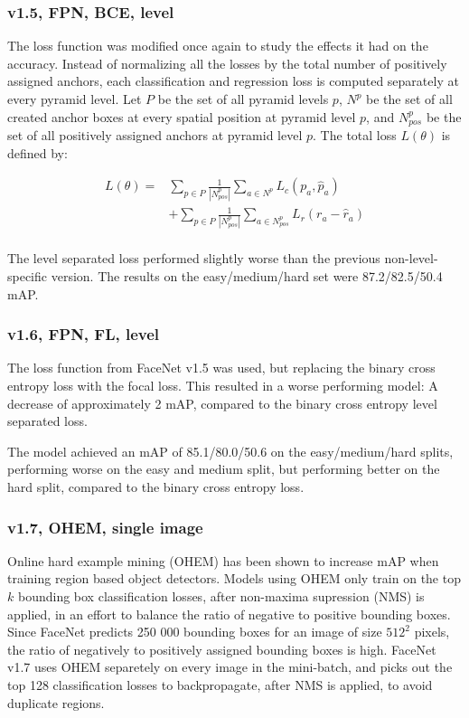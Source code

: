 \documentclass[a4paper, twoside]{article}
\begin{document}
\subsubsection{v1.5, FPN, BCE, level}
The loss function was modified once again to study the effects it had on the accuracy. Instead of normalizing all the losses by the total number of positively assigned anchors, each classification and regression loss is computed separately at every pyramid level. Let $P$ be the set of all pyramid levels $p$, $N^p$ be the set of all created anchor boxes at every spatial position at pyramid level $p$, and $N^p_{pos}$ be the set of all positively assigned anchors at pyramid level $p$. The total loss $L(\theta)$ is defined by:

\begin{equation}
\begin{split}
	L(\theta) = & \sum_{p \in P} \frac{1}{|N^p_{pos}|} \sum_{a \in N^p} L_c(p_a, \hat{p}_a) \\
	 & + \sum_{p \in P}  \frac{1}{|N^p_{pos}|} \sum_{a \in N^p_{pos}} L_r(r_a - \hat{r}_a)  \\ 
\end{split}
\end{equation}

The level separated loss performed slightly worse than the previous non-level-specific version. The results on the easy/medium/hard set were 87.2/82.5/50.4 mAP.

\subsubsection{v1.6, FPN, FL, level}
The loss function from FaceNet v1.5 was used, but replacing the binary cross entropy loss with the focal loss. This resulted in a worse performing model: A decrease of approximately 2 mAP, compared to the binary cross entropy level separated loss. 

The model achieved an mAP of 85.1/80.0/50.6 on the easy/medium/hard splits, performing worse on the easy and medium split, but performing better on the hard split, compared to the binary cross entropy loss.

\subsubsection{v1.7, OHEM, single image}
Online hard example mining (OHEM) \cite{ohem} has been shown to increase mAP when training region based object detectors. Models using OHEM only train on the top $k$ bounding box classification losses, after non-maxima supression (NMS) is applied, in an effort to balance the ratio of negative to positive bounding boxes. Since FaceNet predicts 250 000 bounding boxes for an image of size $512^2$ pixels, the ratio of negatively to positively assigned bounding boxes is high. FaceNet v1.7 uses OHEM separetely on every image in the mini-batch, and picks out the top 128 classification losses to backpropagate, after NMS is applied, to avoid duplicate regions.
\end{document}
